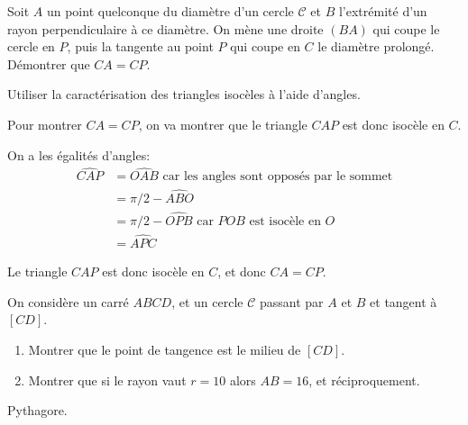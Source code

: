 \begin{exo}[Distances]
Soit $A$  un point quelconque du diamètre d'un cercle $\mathcal C$ et $B$ l'extrémité d'un rayon perpendiculaire à ce diamètre. On mène une droite $(BA)$ qui coupe le cercle en $P$, puis la tangente au point $P$ qui coupe en $C$ le diamètre prolongé. Démontrer que $CA = CP$.

\begin{hint}   
Utiliser la caractérisation des triangles isocèles à l'aide d'angles.
\end{hint}      
\begin{sol}  

Pour montrer $CA=CP$, on va montrer que le triangle $CAP$ est donc isocèle en $C$.

On a les égalités d'angles:
\begin{align*}
\widehat{CAP} &= \widehat{OAB} \text{ car les angles sont opposés par le sommet}\\
&= \pi/2 - \widehat{ABO} \\
&= \pi/2 -\widehat{OPB}  \text{ car $POB$ est isocèle en $O$}\\
&= \widehat{APC}
\end{align*}

Le triangle $CAP$ est donc isocèle en $C$, et donc $CA=CP$.
\end{sol}  
\end{exo}  


\begin{exo} %
On considère un carré $ABCD$, et un cercle $\mathcal C$ passant par $A$ et $B$ et tangent à $[CD]$.
\begin{enumerate}
\item Montrer que le point de tangence est le milieu de $[CD]$.
\item Montrer que si le rayon vaut $r=10$ alors $AB=16$, et réciproquement.
\end{enumerate}

\begin{hint}
Pythagore.
\end{hint}  
\end{exo}  


